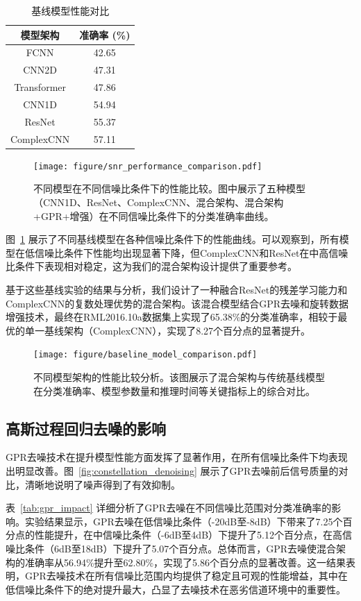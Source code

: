 \documentclass[conference]{IEEEtran}
\begin{document}
\begin{table}[!htbp]
\centering
\caption{基线模型性能对比}
\label{tab:baseline_comparison}
\begin{tabular}{@{}cc@{}}
\toprule
模型架构 & 准确率 (\%) \\
\midrule
FCNN & 42.65 \\
CNN2D & 47.31 \\
Transformer & 47.86 \\
CNN1D & 54.94 \\
ResNet & 55.37 \\
ComplexCNN & 57.11 \\
\bottomrule
\end{tabular}
\end{table}

\begin{figure}[htbp]
\centering
\texttt{[image: figure/snr\_performance\_comparison.pdf]}
\caption{不同模型在不同信噪比条件下的性能比较。图中展示了五种模型（CNN1D、ResNet、ComplexCNN、混合架构、混合架构+GPR+增强）在不同信噪比条件下的分类准确率曲线。}
\label{fig:snr_performance}
\end{figure}

图~\ref{fig:snr_performance} 展示了不同基线模型在各种信噪比条件下的性能曲线。可以观察到，所有模型在低信噪比条件下性能均出现显著下降，但ComplexCNN和ResNet在中高信噪比条件下表现相对稳定，这为我们的混合架构设计提供了重要参考。

基于这些基线实验的结果与分析，我们设计了一种融合ResNet的残差学习能力和ComplexCNN的复数处理优势的混合架构。该混合模型结合GPR去噪和旋转数据增强技术，最终在RML2016.10a数据集上实现了65.38\%的分类准确率，相较于最优的单一基线架构（ComplexCNN），实现了8.27个百分点的显著提升。

\begin{figure}[htbp]
\centering
\texttt{[image: figure/baseline\_model\_comparison.pdf]}
\caption{不同模型架构的性能比较分析。该图展示了混合架构与传统基线模型在分类准确率、模型参数量和推理时间等关键指标上的综合对比。}
\label{fig:model_comparison}
\end{figure}

\subsection{高斯过程回归去噪的影响}
GPR去噪技术在提升模型性能方面发挥了显著作用，在所有信噪比条件下均表现出明显改善。图~\ref{fig:constellation_denoising} 展示了GPR去噪前后信号质量的对比，清晰地说明了噪声得到了有效抑制。

表~\ref{tab:gpr_impact} 详细分析了GPR去噪在不同信噪比范围对分类准确率的影响。实验结果显示，GPR去噪在低信噪比条件（-20dB至-8dB）下带来了7.25个百分点的性能提升，在中信噪比条件（-6dB至4dB）下提升了5.12个百分点，在高信噪比条件（6dB至18dB）下提升了5.07个百分点。总体而言，GPR去噪使混合架构的准确率从56.94\%提升至62.80\%，实现了5.86个百分点的显著改善。这一结果表明，GPR去噪技术在所有信噪比范围内均提供了稳定且可观的性能增益，其中在低信噪比条件下的绝对提升最大，凸显了去噪技术在恶劣信道环境中的重要性。
\end{document}

